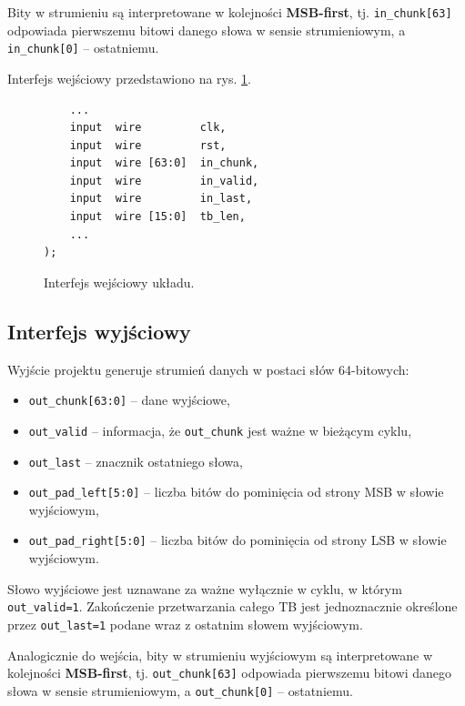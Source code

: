 Bity w strumieniu są interpretowane w kolejności \textbf{MSB-first}, tj. \texttt{in\_chunk[63]} odpowiada pierwszemu bitowi danego słowa w sensie strumieniowym, a \texttt{in\_chunk[0]} -- ostatniemu.

Interfejs wejściowy przedstawiono na rys. \ref{fig:pdschtx_if_in}.

\begin{figure}[!ht]
\centering
\begin{minipage}{0.95\linewidth}
\begin{lstlisting}
    ...
    input  wire         clk,
    input  wire         rst,
    input  wire [63:0]  in_chunk,
    input  wire         in_valid,
    input  wire         in_last,
    input  wire [15:0]  tb_len,
    ...
);
\end{lstlisting}
\end{minipage}
\caption{Interfejs wejściowy układu.}
\label{fig:pdschtx_if_in}
\end{figure}





\subsection{Interfejs wyjściowy}
\label{subsec:interfejs_wyj}

Wyjście projektu generuje strumień danych w postaci słów 64-bitowych:
\begin{itemize}
    \item \texttt{out\_chunk[63:0]} -- dane wyjściowe,
    \item \texttt{out\_valid} -- informacja, że \texttt{out\_chunk} jest ważne w bieżącym cyklu,
    \item \texttt{out\_last} -- znacznik ostatniego słowa,
    \item \texttt{out\_pad\_left[5:0]} -- liczba bitów do pominięcia od strony MSB w słowie wyjściowym,
    \item \texttt{out\_pad\_right[5:0]} -- liczba bitów do pominięcia od strony LSB w słowie wyjściowym.
\end{itemize}

Słowo wyjściowe jest uznawane za ważne wyłącznie w cyklu, w którym \texttt{out\_valid=1}. Zakończenie przetwarzania całego TB jest jednoznacznie określone przez \texttt{out\_last=1} podane wraz z ostatnim słowem wyjściowym.

Analogicznie do wejścia, bity w strumieniu wyjściowym są interpretowane w kolejności \textbf{MSB-first}, tj. \texttt{out\_chunk[63]} odpowiada pierwszemu bitowi danego słowa w sensie strumieniowym, a \texttt{out\_chunk[0]} -- ostatniemu.

